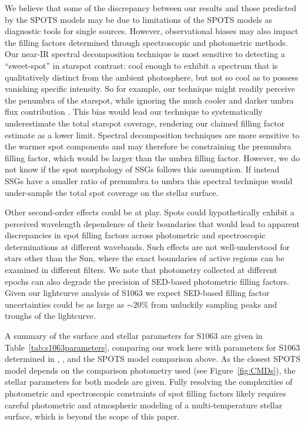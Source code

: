 \documentclass[trackchanges]{aastex631}
\begin{document}
We believe that some of the discrepancy between our results and those predicted by the SPOTS models may be due to limitations of the SPOTS models as diagnostic tools for single sources. However, observational biases may also impact the filling factors determined through spectroscopic and photometric methods. Our near-IR spectral decomposition technique is most sensitive to detecting a ``sweet-spot'' in starspot contrast: cool enough to exhibit a spectrum that is qualitatively distinct from the ambient photosphere, but not so cool as to possess vanishing specific intensity.  So for example, our technique might readily perceive the penumbra of the starspot, while ignoring the much cooler and darker umbra flux contribution \citep{1981ApJ...250..327V}.  This bias would lead our technique to systematically underestimate the total starspot coverage, rendering our claimed filling factor estimate as a lower limit. Spectral decomposition techniques are more sensitive to the warmer spot components and may therefore be constraining the prenumbra filling factor, which would be larger than the umbra filling factor. However, we do not know if the spot morphology of SSGs follows this assumption. If instead SSGs have a smaller ratio of prenumbra to umbra this spectral technique would under-sample the total spot coverage on the stellar surface.

Other second-order effects could be at play.  Spots could hypothetically exhibit a perceived wavelength dependence of their boundaries that would lead to apparent discrepancies in spot filling factors across photometric and spectroscopic determinations at different wavebands.  Such effects are not well-understood for stars other than the Sun, where the exact boundaries of active regions can be examined in different filters.  We note that photometry collected at different epochs can also degrade the precision of SED-based photometric filling factors. Given our lightcurve analysis of S1063 we expect SED-based filling factor uncertainties could be as large as $\sim$20\% from unluckily sampling peaks and troughs of the lightcurve.

A summary of the surface and stellar parameters for S1063 are given in Table~\ref{tab:s1063parameters}, comparing our work here with parameters for S1063 determined in \citet{mathieu03}, \citet{leiner17}, and the SPOTS model comparison above. As the closest SPOTS model depends on the comparison photometry used (see Figure~\ref{fig:CMDs}), the stellar parameters for both models are given.  Fully resolving the complexities of photometric and spectroscopic constraints of spot filling factors likely requires careful photometric and atmospheric modeling of a multi-temperature stellar surface, which is beyond the scope of this paper.
\end{document}
